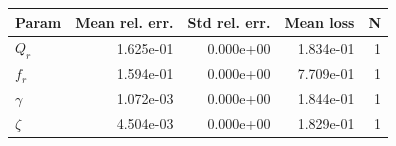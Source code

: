 \begin{tabular}{lrrrr}
\hline
Param & Mean rel. err. & Std rel. err. & Mean loss & N \\
\hline
$Q_r$ & 1.625e-01 & 0.000e+00 & 1.834e-01 & 1 \\
$f_r$ & 1.594e-01 & 0.000e+00 & 7.709e-01 & 1 \\
$\gamma$ & 1.072e-03 & 0.000e+00 & 1.844e-01 & 1 \\
$\zeta$ & 4.504e-03 & 0.000e+00 & 1.829e-01 & 1 \\
\hline
\end{tabular}
